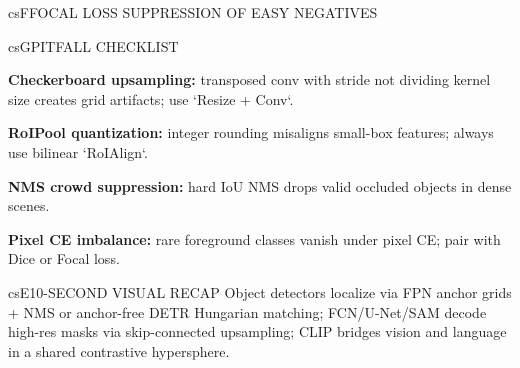 \documentclass[../../../../master.tex]{subfiles}
\begin{document}
\begin{cscolumns}
\begin{cscard}{csF}{FOCAL LOSS SUPPRESSION OF EASY NEGATIVES}
  \centering
\end{cscard}
\columnbreak

\begin{cscard}{csG}{PITFALL CHECKLIST}
  \begin{csbul}
    \item \textbf{Checkerboard upsampling:} transposed conv with stride not dividing kernel size creates grid artifacts; use `Resize + Conv`.
    \item \textbf{RoIPool quantization:} integer rounding misaligns small-box features; always use bilinear `RoIAlign`.
    \item \textbf{NMS crowd suppression:} hard IoU NMS drops valid occluded objects in dense scenes.
    \item \textbf{Pixel CE imbalance:} rare foreground classes vanish under pixel CE; pair with Dice or Focal loss.
  \end{csbul}
\end{cscard}

\begin{cscard}{csE}{10-SECOND VISUAL RECAP}
  \sffamily\footnotesize
  Object detectors localize via FPN anchor grids + NMS or anchor-free DETR Hungarian matching; FCN/U-Net/SAM decode high-res masks via skip-connected upsampling; CLIP bridges vision and language in a shared contrastive hypersphere.
\end{cscard}
\end{cscolumns}

\csend
\end{document}
